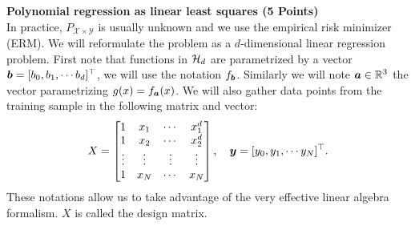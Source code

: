 \documentclass{article}
\newcommand{\bb}{b}
\begin{document}
\textbf{\color{nyupurple} Polynomial regression as linear least squares (5 Points)}\\
In practice, $P_{\mathcal{X} \times \mathcal{Y}}$ is usually unknown and we use the empirical risk minimizer (ERM). We will reformulate the problem as a $d$-dimensional linear regression problem. 
First note that functions in ${\mathcal{H}}_d$ are parametrized by a vector $\bs \bb = [\bb_0, \bb_1, \cdots \bb_d]^\top$, we will use the notation $f_{\bs \bb}$. Similarly we will note $\boldsymbol{a} \in {\mathbb{R}}^3$ the vector parametrizing $g(x) = f_{\boldsymbol{a}}(x)$. We will also gather data points from the training sample in the following matrix and vector:
\begin{align}
    X = \left[\begin{matrix}
    1 & x_1 & \cdots & x_1^d \\
    1 & x_2 & \cdots & x_2^d \\
    \vdots & \vdots & \vdots & \vdots \\
    1 & x_N & \cdots & x_N
\end{matrix} \right], \quad 
\boldsymbol{y} = [y_0, y_1, \cdots y_N]^\top.
\end{align}
These notations allow us to take advantage of the very effective linear algebra formalism. $X$ is called the design matrix.
\end{document}
